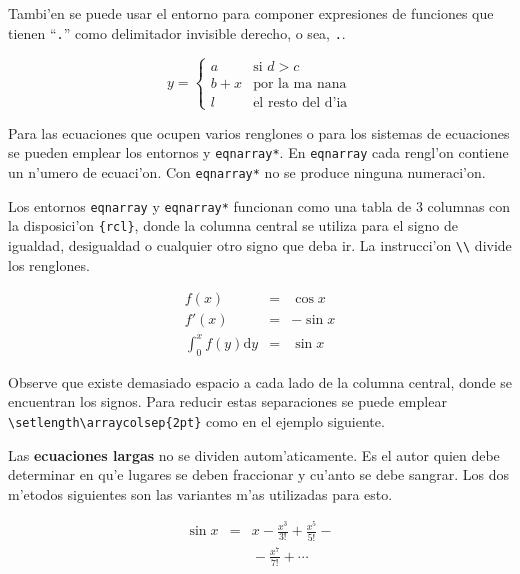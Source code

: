 Tambi'en se puede usar el entorno  para componer expresiones
de funciones que tienen ``\verb|.|'' como delimitador invisible
derecho, o sea, \verb|.|.

\begin{example}
\begin{displaymath}
y = \left\{ \begin{array}{ll}
 a & \textrm{si $d>c$}\\
 b+x & \textrm{por la ma~nana}\\
 l & \textrm{el resto del d'ia}
  \end{array} \right.
\end{displaymath}
\end{example}


Para las ecuaciones que ocupen varios renglones o para los sistemas de
ecuaciones  se pueden emplear los
entornos  y \verb|eqnarray*|. En \texttt{eqnarray} cada
rengl'on contiene un n'umero de ecuaci'on. Con \verb|eqnarray*| no se
produce ninguna numeraci'on.

Los entornos \texttt{eqnarray} y \verb|eqnarray*| funcionan como una
tabla de 3 columnas con la disposici'on \verb|{rcl}|, donde la columna
central se utiliza para el signo de igualdad, desigualdad o cualquier
otro signo que deba ir. La instrucci'on \verb|\\| divide los
renglones.

\begin{example}
\begin{eqnarray}
f(x) & = & \cos x       \\
f'(x) & = & -\sin x     \\
\int_{0}^{x} f(y) \mathrm{d}y &
 = & \sin x
\end{eqnarray}
\end{example}

\noindent Observe que existe demasiado espacio a cada lado de la
columna central, donde se encuentran los signos. Para reducir estas
separaciones se puede emplear \verb|\setlength\arraycolsep{2pt}| como
en el ejemplo siguiente.

 Las \textbf{ecuaciones largas} no se dividen
autom'aticamente. Es el autor quien debe determinar en qu'e lugares se
deben fraccionar y cu'anto se debe sangrar. Los dos m'etodos
siguientes son las variantes m'as utilizadas para esto.

\begin{example}
{\setlength\arraycolsep{2pt}
\begin{eqnarray}
\sin x & = & x -\frac{x^{3}}{3!}
     +\frac{x^{5}}{5!}-{}
                    \nonumber\\
 & & {}-\frac{x^{7}}{7!}+{}\cdots
\end{eqnarray}}
\end{example}
\pagebreak[1]

